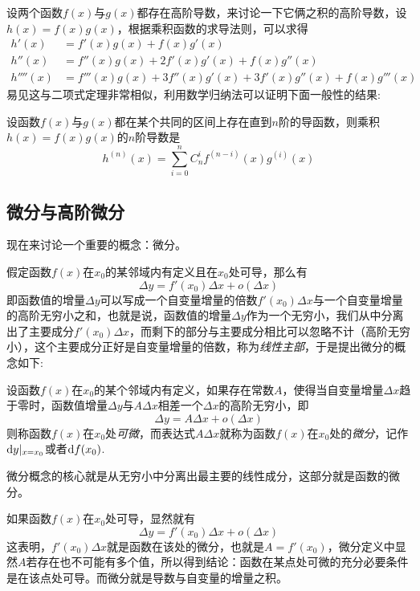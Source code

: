 设两个函数$f(x)$与$g(x)$都存在高阶导数，来讨论一下它俩之积的高阶导数，设$h(x)=f(x)g(x)$，根据乘积函数的求导法则，可以求得
\begin{align*}
  h'(x) & = f'(x)g(x)+f(x)g'(x) \\
  h''(x) & = f''(x)g(x)+2f'(x)g'(x)+f(x)g''(x) \\
  h''''(x) & = f'''(x)g(x)+3f''(x)g'(x)+3f'(x)g''(x)+f(x)g'''(x)
\end{align*}
易见这与二项式定理非常相似，利用数学归纳法可以证明下面一般性的结果:

\begin{theorem}
  设函数$f(x)$与$g(x)$都在某个共同的区间上存在直到$n$阶的导函数，则乘积$h(x)=f(x)g(x)$的$n$阶导数是
  \[ h^{(n)}(x) = \sum_{i=0}^n C_n^i f^{(n-i)}(x)g^{(i)}(x) \]
\end{theorem}

\subsection{微分与高阶微分}
\label{sec:difference-and-high-level-difference}

现在来讨论一个重要的概念：微分。

假定函数$f(x)$在$x_0$的某邻域内有定义且在$x_0$处可导，那么有
\[ \Delta y = f'(x_0)\Delta x + o(\Delta x) \]
即函数值的增量$\Delta y$可以写成一个自变量增量的倍数$f'(x_0)\Delta x$与一个自变量增量的高阶无穷小之和，也就是说，函数值的增量$\Delta y$作为一个无穷小，我们从中分离出了主要成分$f'(x_0)\Delta x$，而剩下的部分与主要成分相比可以忽略不计（高阶无穷小），这个主要成分正好是自变量增量的倍数，称为\emph{线性主部}，于是提出微分的概念如下:
\begin{definition}
  设函数$f(x)$在$x_0$的某个邻域内有定义，如果存在常数$A$，使得当自变量增量$\Delta x$趋于零时，函数值增量$\Delta y$与$A\Delta x$相差一个$\Delta x$的高阶无穷小，即
  \[ \Delta y = A \Delta x + o(\Delta x) \]
  则称函数$f(x)$在$x_0$处\emph{可微}，而表达式$A\Delta x$就称为函数$f(x)$在$x_0$处的\emph{微分}，记作$\mathop{}\!\mathrm{d} y |_{x=x_0}$或者$\mathop{}\!\mathrm{d} f(x_0)$.
\end{definition}

微分概念的核心就是从无穷小中分离出最主要的线性成分，这部分就是函数的微分。

如果函数$f(x)$在$x_0$处可导，显然就有
\[ \Delta y = f'(x_0)\Delta x + o(\Delta x) \]
这表明，$f'(x_0)\Delta x$就是函数在该处的微分，也就是$A=f'(x_0)$，微分定义中显然$A$若存在也不可能有多个值，所以得到结论：函数在某点处可微的充分必要条件是在该点处可导。而微分就是导数与自变量的增量之积。

